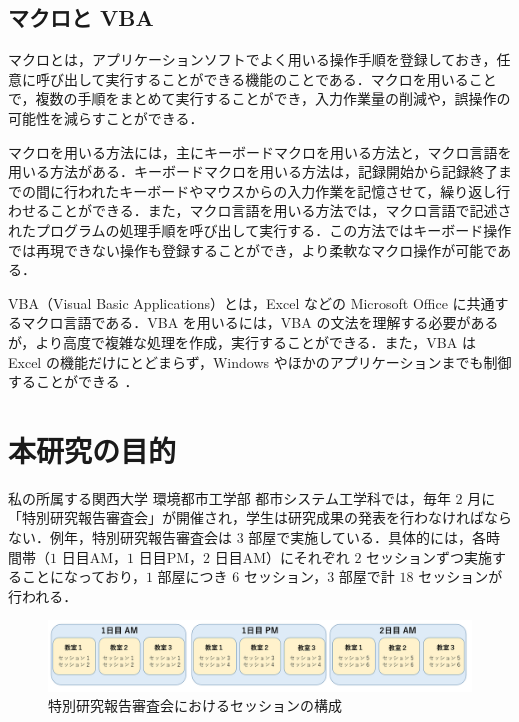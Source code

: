 \documentclass[a4paper,12pt,fleqn]{jarticle}
\begin{document}
\subsection{マクロと VBA}
マクロとは，アプリケーションソフトでよく用いる操作手順を登録しておき，任意に呼び出して実行することができる機能のことである．マクロを用いることで，複数の手順をまとめて実行することができ，入力作業量の削減や，誤操作の可能性を減らすことができる\cite{VBA1}．

マクロを用いる方法には，主にキーボードマクロを用いる方法と，マクロ言語を用いる方法がある．キーボードマクロを用いる方法は，記録開始から記録終了までの間に行われたキーボードやマウスからの入力作業を記憶させて，繰り返し行わせることができる．また，マクロ言語を用いる方法では，マクロ言語で記述されたプログラムの処理手順を呼び出して実行する．この方法ではキーボード操作では再現できない操作も登録することができ，より柔軟なマクロ操作が可能である\cite{VBA3}．

VBA（Visual Basic Applications）とは，Excel などの Microsoft Office に共通するマクロ言語である．VBA を用いるには，VBA の文法を理解する必要があるが，より高度で複雑な処理を作成，実行することができる．また，VBA は Excel の機能だけにとどまらず，Windows やほかのアプリケーションまでも制御することができる \cite{VBA2}．

\newpage
\section{本研究の目的}
私の所属する関西大学 環境都市工学部 都市システム工学科では，毎年 $2$ 月に「特別研究報告審査会」が開催され，学生は研究成果の発表を行わなければならない．例年，特別研究報告審査会は $3$ 部屋で実施している．具体的には，各時間帯（$1$ 日目AM，$1$ 日目PM，$2$ 日目AM）にそれぞれ $2$ セッションずつ実施することになっており，$1$ 部屋につき $6$ セッション，$3$ 部屋で計 $18$ セッションが行われる．
\begin{figure}[H]
  \begin{center}
    \includegraphics[scale=0.6]{gaiyou.png}
    \caption{特別研究報告審査会におけるセッションの構成}
    \label{Session}
  \end{center}
\end{figure}
\end{document}
